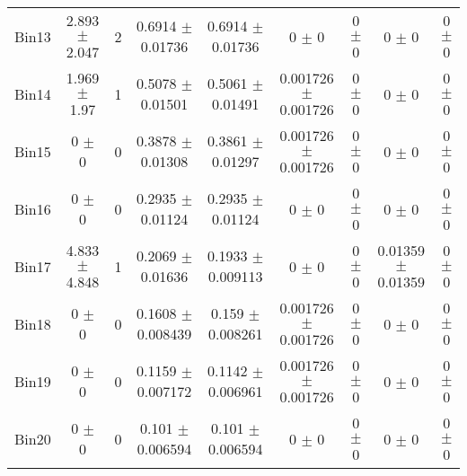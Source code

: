 \begin{tabular}{@{\extracolsep{4pt}}lcccccccc@{}}
     Bin13 & 2.893 $\pm$ 2.047 & 2 & 0.6914 $\pm$ 0.01736 & 0.6914 $\pm$ 0.01736 & 0 $\pm$ 0 & 0 $\pm$ 0 & 0 $\pm$ 0 & 0 $\pm$ 0 \\ 
     Bin14 & 1.969 $\pm$ 1.97 & 1 & 0.5078 $\pm$ 0.01501 & 0.5061 $\pm$ 0.01491 & 0.001726 $\pm$ 0.001726 & 0 $\pm$ 0 & 0 $\pm$ 0 & 0 $\pm$ 0 \\ 
     Bin15 & 0 $\pm$ 0 & 0 & 0.3878 $\pm$ 0.01308 & 0.3861 $\pm$ 0.01297 & 0.001726 $\pm$ 0.001726 & 0 $\pm$ 0 & 0 $\pm$ 0 & 0 $\pm$ 0 \\ 
     Bin16 & 0 $\pm$ 0 & 0 & 0.2935 $\pm$ 0.01124 & 0.2935 $\pm$ 0.01124 & 0 $\pm$ 0 & 0 $\pm$ 0 & 0 $\pm$ 0 & 0 $\pm$ 0 \\ 
     Bin17 & 4.833 $\pm$ 4.848 & 1 & 0.2069 $\pm$ 0.01636 & 0.1933 $\pm$ 0.009113 & 0 $\pm$ 0 & 0 $\pm$ 0 & 0.01359 $\pm$ 0.01359 & 0 $\pm$ 0 \\ 
     Bin18 & 0 $\pm$ 0 & 0 & 0.1608 $\pm$ 0.008439 & 0.159 $\pm$ 0.008261 & 0.001726 $\pm$ 0.001726 & 0 $\pm$ 0 & 0 $\pm$ 0 & 0 $\pm$ 0 \\ 
     Bin19 & 0 $\pm$ 0 & 0 & 0.1159 $\pm$ 0.007172 & 0.1142 $\pm$ 0.006961 & 0.001726 $\pm$ 0.001726 & 0 $\pm$ 0 & 0 $\pm$ 0 & 0 $\pm$ 0 \\ 
     Bin20 & 0 $\pm$ 0 & 0 & 0.101 $\pm$ 0.006594 & 0.101 $\pm$ 0.006594 & 0 $\pm$ 0 & 0 $\pm$ 0 & 0 $\pm$ 0 & 0 $\pm$ 0 \\ 
\hline\hline
  \end{tabular}
